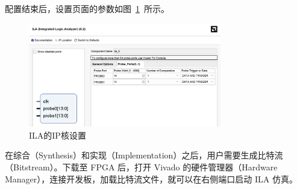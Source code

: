 配置结束后，设置页面的参数如图~\ref{fig:exp3:ILA}~所示。
\begin{figure}[htbp]
  \centering
  \includegraphics[width=0.75\textwidth]{figure/exp3/ila.png}
  \caption{ILA的IP核设置}
  \label{fig:exp3:ILA}
\end{figure}

在综合（Synthesis）和实现（Implementation）之后，用户需要生成比特流（Bitstream）。下载至 FPGA 后，打开 Vivado 的硬件管理器（Hardware Manager），连接开发板，加载比特流文件，就可以在右侧端口启动 ILA 仿真。


